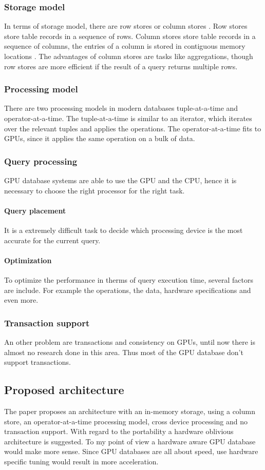 \subsubsection{Storage model}
In terms of storage model, there are row stores or column stores \cite{abadi2008column}.
Row stores store table records in a sequence of rows.
Column stores store table records in a sequence of columns, the entries of a column is stored in contiguous memory locations \cite{bress2014design}.
The advantages of column stores are tasks like aggregations, though row stores are more efficient if the result of a query returns multiple rows.


\subsubsection{Processing model}
There are two processing models in modern databases tuple-at-a-time and operator-at-a-time.
The tuple-at-a-time is similar to an iterator, which iterates over the relevant tuples and applies the operations.
The operator-at-a-time fits to GPUs, since it applies the same operation on a bulk of data.

\subsubsection{Query processing}
GPU database systems are able to use the GPU and the CPU, hence it is necessary to choose the right processor for the right task.
\paragraph{Query placement} It is a extremely difficult task to decide which processing device is the most accurate for the current query.
\paragraph{Optimization} To optimize the performance in therms of query execution time, several factors are include.
For example the operations, the data, hardware specifications and even more.

\subsubsection{Transaction support}
An other problem are transactions and consistency on GPUs, until now there is almost no research done in this area.
Thus most of the GPU database don't support transactions.


\subsection{Proposed architecture}
The paper \cite{bress2014gpu} proposes an architecture with an in-memory storage, using a column store, an operator-at-a-time processing model, cross device processing and no transaction support.
With regard to the portability a hardware oblivious architecture is suggested.
To my point of view a hardware aware GPU database would make more sense.
Since GPU databases are all about speed, use hardware specific tuning would result in more acceleration.